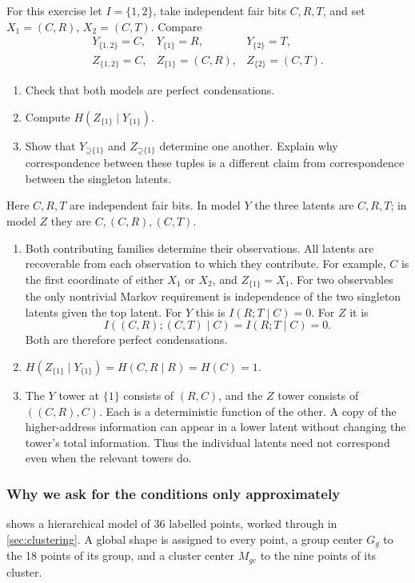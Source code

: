 \documentclass[11pt]{article}
\newcommand{\Up}{\mathord{\supseteq}}
\begin{document}
\begin{exercise}
\label{ex:duplicates}\important
For this exercise let $I=\{1,2\}$, take independent fair bits $C,R,T$, and set
$X_1=(C,R)$, $X_2=(C,T)$. Compare
\[
\begin{array}{lll}
 Y_{\{1,2\}}=C,&Y_{\{1\}}=R,&Y_{\{2\}}=T,\\
 Z_{\{1,2\}}=C,&Z_{\{1\}}=(C,R),&Z_{\{2\}}=(C,T).
\end{array}
\]
\begin{enumerate}
\item Check that both models are perfect condensations.
\item Compute $H(Z_{\{1\}}\mid Y_{\{1\}})$.
\item Show that $Y_{\Up\{1\}}$ and $Z_{\Up\{1\}}$ determine one
another. Explain why correspondence between these tuples is a different
claim from correspondence between the singleton latents.
\end{enumerate}
\end{exercise}
\begin{solution}[ex:duplicates]
Here $C,R,T$ are independent fair bits. In model $Y$ the three latents are
$C,R,T$; in model $Z$ they are $C,(C,R),(C,T)$.
\begin{enumerate}
\item Both contributing families determine their observations. All latents are
recoverable from each observation to which they contribute. For example,
$C$ is the first coordinate of either $X_1$ or $X_2$, and $Z_{\{1\}}=X_1$.
For two observables the only nontrivial Markov requirement is independence of
the two singleton latents given the top latent. For $Y$ this is
$I(R;T\mid C)=0$. For $Z$ it is
\[
 I((C,R);(C,T)\mid C)=I(R;T\mid C)=0.
\]
Both are therefore perfect condensations.
\item $H(Z_{\{1\}}\mid Y_{\{1\}})=H(C,R\mid R)=H(C)=1$.
\item The $Y$ tower at $\{1\}$ consists of $(R,C)$, and the $Z$ tower
consists of $((C,R),C)$. Each is a deterministic function of the other. A copy
of the higher-address information can appear in a lower latent without changing
the tower's total information. Thus the individual latents need not correspond
even when the relevant towers do.
\end{enumerate}
\end{solution}

\subsubsection{Why we ask for the conditions only approximately}
 shows a hierarchical model of 36 labelled points, worked
through in \cref{sec:clustering}. A global shape is assigned to every point, a
group center $G_g$ to the 18 points of its group, and a cluster center $M_{gc}$
to the nine points of its cluster.
\end{document}
